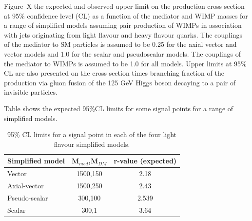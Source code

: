 
Figure~X  
the expected and observed upper limit on the
production cross section at 95\% confidence level (CL) as a function
of the mediator and WIMP masses for a range of simplified models assuming
pair production of WIMPs in association with jets originating from light flavour and heavy flavour quarks. The couplings of the mediator to SM particles is assumed to be 0.25 for the axial vector and vector models and 1.0 for the scalar and pseudoscalar models. The couplings of the mediator to WIMPs is assumed to be 1.0 for all models. 
Upper limits at 95\% CL are also presented on the cross section times branching fraction of the production via gluon fusion of the 125 GeV Higgs boson decaying to a pair of invisible particles. 

Table shows the expected 95\%CL limits for some signal points for a range of simplified models. 
\begin{table}[h!]
  \caption{%
    95\% CL limits for a signal point in each of the four light flavour simplified models. }
  \label{tab:limits}
  \centering
  \begin{tabular}{ lcc }
    \hline
    \hline
    Simplified model              & M$_{med}$,M$_{DM}$          & r-value (expected) \\ \hline
Vector & 1500,150 & 2.18 \\
Axial-vector & 1500,250 & 2.43 \\
Pseudo-scalar & 300,100 & 2.539 \\
Scalar & 300,1 & 3.64 \\
    \hline
    \hline
  \end{tabular}
\end{table}



